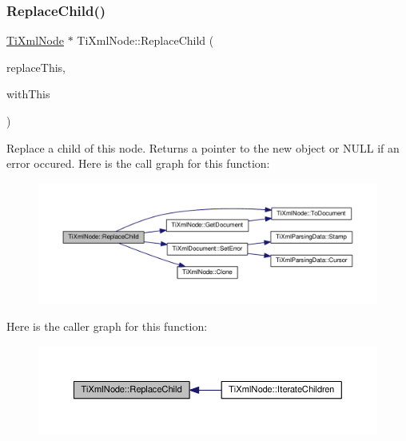 \subsubsection{\texorpdfstring{Replace\+Child()}{ReplaceChild()}}
{\footnotesize\ttfamily \hyperlink{class_ti_xml_node}{Ti\+Xml\+Node} $\ast$ Ti\+Xml\+Node\+::\+Replace\+Child (\begin{DoxyParamCaption}\item[{\hyperlink{class_ti_xml_node}{Ti\+Xml\+Node} $\ast$}]{replace\+This,  }\item[{const \hyperlink{class_ti_xml_node}{Ti\+Xml\+Node} \&}]{with\+This }\end{DoxyParamCaption})}

Replace a child of this node. Returns a pointer to the new object or N\+U\+LL if an error occured. Here is the call graph for this function\+:\nopagebreak
\begin{figure}[H]
\begin{center}
\leavevmode
\includegraphics[width=350pt]{class_ti_xml_node_a543208c2c801c84a213529541e904b9f_cgraph}
\end{center}
\end{figure}
Here is the caller graph for this function\+:\nopagebreak
\begin{figure}[H]
\begin{center}
\leavevmode
\includegraphics[width=350pt]{class_ti_xml_node_a543208c2c801c84a213529541e904b9f_icgraph}
\end{center}
\end{figure}
\mbox{\label{class_ti_xml_node_a2a38329ca5d3f28f98ce932b8299ae90}} 
